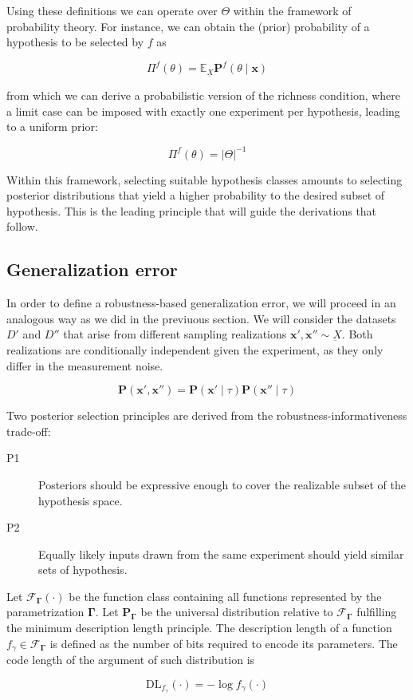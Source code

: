 Using these definitions we can operate over $\Theta$ within the framework of probability 
theory. For instance, we can obtain the (prior) probability of a hypothesis to be
selected by $f$ as

$$
 \Pi^f (\theta) = \mathbb{E}_{\underline{X}} \mathbf{P}^f (\theta \mid \bm{x})
$$

from which we can derive a probabilistic version of the richness condition, where a limit
case can be imposed with exactly one experiment per hypothesis, leading to a uniform prior:

$$
\Pi^f (\theta) = |\Theta|^{-1}
$$

Within this framework, selecting suitable hypothesis classes amounts to selecting
posterior distributions that yield a higher probability to the desired subset of hypothesis. This
is the leading principle that will guide the derivations that follow.

\subsection{Generalization error}

In order to define a robustness-based generalization error, we will proceed in an
analogous way as we did in the previuous section. We will consider the datasets $D'$ and $D''$
that arise from different sampling realizations $\bm{x}', \bm{x}'' \sim \underbar{X}$. 
Both realizations are conditionally independent given the experiment, as
they only differ in the measurement noise.

$$
    \mathbf{P}(\bm{x}', \bm{x}'') = \mathbf{P}(\bm{x}' \mid \tau) \mathbf{P}(\bm{x}'' \mid \tau)
$$

Two posterior selection principles are derived from the robustness-informativeness trade-off:
\vspace{-2mm}
\begin{description}
    \item[P1] Posteriors should be expressive enough to cover the realizable subset of the hypothesis space.
    \vspace{-3mm}
    \item[P2] Equally likely inputs drawn from the same experiment should yield similar sets of hypothesis.
\end{description}

\begin{definition}
    Let $\mathcal{F}_{\bm{\Gamma}}(\cdot)$ be the function class containing all functions 
    represented by the parametrization $\bm{\Gamma}$. Let $\mathbf{P}_{\bm{\Gamma}}$ be the
    universal distribution relative to $\mathcal{F}_{\bm{\Gamma}}$ fulfilling the minimum
    description length principle. The description length of a function $f_\gamma \in \mathcal{F}_{\bm{\Gamma}}$ 
    is defined as the number of bits required to encode its parameters. The code length
    of the argument of such distribution is

    $$
    \text{DL}_{f_{\gamma}}(\cdot) = -\log f_{\gamma}(\cdot)
    $$
\end{definition}


